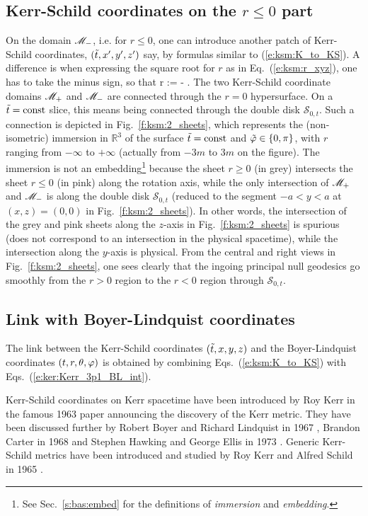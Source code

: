 \subsection{Kerr-Schild coordinates on the $r\leq 0$ part}

On the domain $\mathscr{M}_-$, i.e. for $r\leq 0$,
one can introduce another patch of Kerr-Schild coordinates, $({\tilde t},x',y',z')$ say,
by formulas similar to (\ref{e:ksm:K_to_KS}). A difference is when expressing
the square root for $r$ as in Eq.~(\ref{e:ksm:r_xyz}), one has to take the
minus sign, so that
\be
    r := -  .
\ee
The two Kerr-Schild coordinate domains $\mathscr{M}_+$ and $\mathscr{M}_-$ are connected through
the $r=0$ hypersurface. On a ${\tilde t}=\mathrm{const}$ slice, this means being
connected through the double disk $\mathcal{S}_{0,t}$. Such a connection
is depicted in Fig.~\ref{f:ksm:2_sheets}, which represents the (non-isometric)
immersion in $\mathbb{R}^3$ of the surface ${\tilde t}=\mathrm{const}$ and ${\tilde\varphi}\in\{0,\pi\}$,
with $r$ ranging from $-\infty$ to $+\infty$ (actually from $-3m$ to $3m$
on the figure). The immersion is not an embedding\footnote{See Sec.~\ref{s:bas:embed}
for the definitions of \emph{immersion} and \emph{embedding}.} because the
sheet $r\geq 0$ (in grey) intersects the sheet $r\leq 0$ (in pink) along the
rotation axis, while the only intersection of $\mathscr{M}_+$ and $\mathscr{M}_-$ is along
the double disk $\mathcal{S}_{0,t}$ (reduced to the segment $-a < y< a$ at
$(x,z) = (0,0)$ in Fig.~\ref{f:ksm:2_sheets}). In other words, the intersection
of the grey and pink sheets along the $z$-axis in Fig.~\ref{f:ksm:2_sheets}
is spurious (does not correspond to an intersection in the physical spacetime),
while the intersection along the $y$-axis is physical.
From the central and right views in Fig.~\ref{f:ksm:2_sheets}, one sees clearly
that the ingoing principal null geodesics go smoothly from the $r > 0$ region
to the $r < 0$ region through $\mathcal{S}_{0,t}$.


\subsection{Link with Boyer-Lindquist coordinates}

The link between the Kerr-Schild coordinates $({\tilde t},x,y,z)$ and the Boyer-Lindquist
coordinates $(t,r,\theta,\varphi)$
is obtained by combining Eqs.~(\ref{e:ksm:K_to_KS}) with Eqs.~(\ref{e:ker:Kerr_3p1_BL_int}).


\begin{hist}
Kerr-Schild coordinates on Kerr spacetime have been introduced by Roy Kerr in the famous 1963 paper
\cite{Kerr63} announcing the discovery of the
Kerr metric. They have been discussed further by Robert Boyer and Richard Lindquist
in 1967 \cite{BoyerL67}, Brandon Carter in 1968
\cite{Carte68a}
and Stephen Hawking and George Ellis in 1973 \cite{HawkiE73}.
Generic Kerr-Schild metrics have been introduced and studied by Roy Kerr and Alfred
Schild
in 1965 \cite{KerrS65}.
\end{hist}
